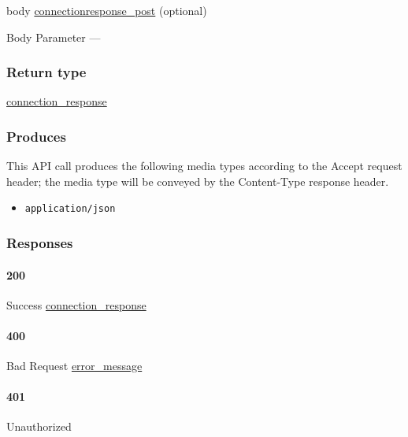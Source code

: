 body
\protect\hyperlink{connectionresponse_post}{connectionresponse\_post}
(optional)

{Body Parameter} ---

\hypertarget{return-type-88}{%
\subsubsection{Return type}\label{return-type-88}}

\protect\hyperlink{connection_response}{connection\_response}

\hypertarget{produces-113}{%
\subsubsection{Produces}\label{produces-113}}

This API call produces the following media types according to the
{Accept} request header; the media type will be conveyed by the
{Content-Type} response header.

\begin{itemize}
\tightlist
\item
  \texttt{application/json}
\end{itemize}

\hypertarget{responses-116}{%
\subsubsection{Responses}\label{responses-116}}

\hypertarget{section-379}{%
\paragraph{200}\label{section-379}}

Success \protect\hyperlink{connection_response}{connection\_response}

\hypertarget{section-380}{%
\paragraph{400}\label{section-380}}

Bad Request \protect\hyperlink{error_message}{error\_message}

\hypertarget{section-381}{%
\paragraph{401}\label{section-381}}

Unauthorized \protect\hyperlink{}{}

